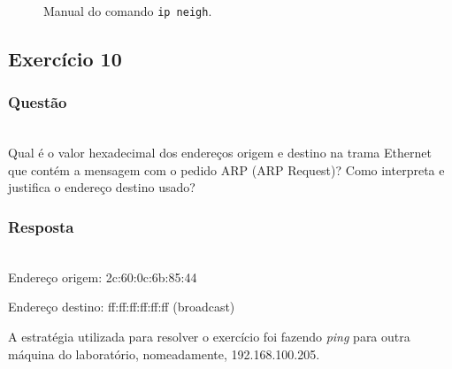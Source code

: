 \documentclass{llncs}
\begin{document}
\begin{figure}
  \caption{Manual do comando \texttt{ip neigh}.}
  \label{fig:ip_neigh}
\end{figure}


\clearpage
\subsection{Exercício 10}
\subsubsection{Questão}\rule[-10pt]{0pt}{10pt}\\

Qual é o valor hexadecimal dos endereços origem e destino na trama Ethernet que contém a mensagem com o pedido ARP (ARP Request)? Como interpreta e justifica o endereço destino usado?

\subsubsection{Resposta}\rule[-10pt]{0pt}{10pt}\\

Endereço origem: 2c:60:0c:6b:85:44

Endereço destino: ff:ff:ff:ff:ff:ff (broadcast)

A estratégia utilizada para resolver o exercício foi fazendo \textit{ping} para outra máquina do laboratório, nomeadamente, 192.168.100.205.
\end{document}

